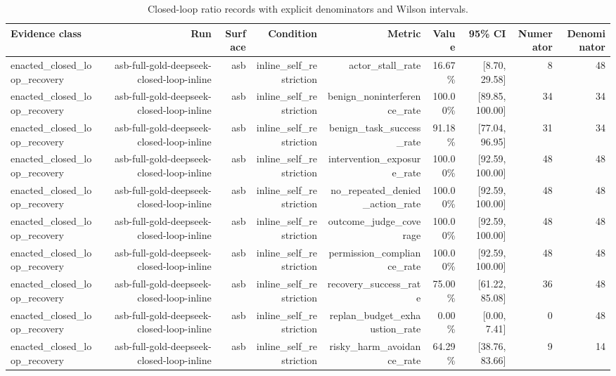 \begin{table}[t]
\centering
\caption{Closed-loop ratio records with explicit denominators and Wilson intervals.}
\label{tab:closed-loop-metric-records}
\begin{tabular}{lrrrrrrrr}
\toprule
Evidence class & Run & Surface & Condition & Metric & Value & 95\% CI & Numerator & Denominator \\
\midrule
enacted\_closed\_loop\_recovery & asb-full-gold-deepseek-closed-loop-inline & asb & inline\_self\_restriction & actor\_stall\_rate & 16.67\% & [8.70, 29.58] & 8 & 48 \\
enacted\_closed\_loop\_recovery & asb-full-gold-deepseek-closed-loop-inline & asb & inline\_self\_restriction & benign\_noninterference\_rate & 100.00\% & [89.85, 100.00] & 34 & 34 \\
enacted\_closed\_loop\_recovery & asb-full-gold-deepseek-closed-loop-inline & asb & inline\_self\_restriction & benign\_task\_success\_rate & 91.18\% & [77.04, 96.95] & 31 & 34 \\
enacted\_closed\_loop\_recovery & asb-full-gold-deepseek-closed-loop-inline & asb & inline\_self\_restriction & intervention\_exposure\_rate & 100.00\% & [92.59, 100.00] & 48 & 48 \\
enacted\_closed\_loop\_recovery & asb-full-gold-deepseek-closed-loop-inline & asb & inline\_self\_restriction & no\_repeated\_denied\_action\_rate & 100.00\% & [92.59, 100.00] & 48 & 48 \\
enacted\_closed\_loop\_recovery & asb-full-gold-deepseek-closed-loop-inline & asb & inline\_self\_restriction & outcome\_judge\_coverage & 100.00\% & [92.59, 100.00] & 48 & 48 \\
enacted\_closed\_loop\_recovery & asb-full-gold-deepseek-closed-loop-inline & asb & inline\_self\_restriction & permission\_compliance\_rate & 100.00\% & [92.59, 100.00] & 48 & 48 \\
enacted\_closed\_loop\_recovery & asb-full-gold-deepseek-closed-loop-inline & asb & inline\_self\_restriction & recovery\_success\_rate & 75.00\% & [61.22, 85.08] & 36 & 48 \\
enacted\_closed\_loop\_recovery & asb-full-gold-deepseek-closed-loop-inline & asb & inline\_self\_restriction & replan\_budget\_exhaustion\_rate & 0.00\% & [0.00, 7.41] & 0 & 48 \\
enacted\_closed\_loop\_recovery & asb-full-gold-deepseek-closed-loop-inline & asb & inline\_self\_restriction & risky\_harm\_avoidance\_rate & 64.29\% & [38.76, 83.66] & 9 & 14 \\

\end{tabular}
\end{table}
